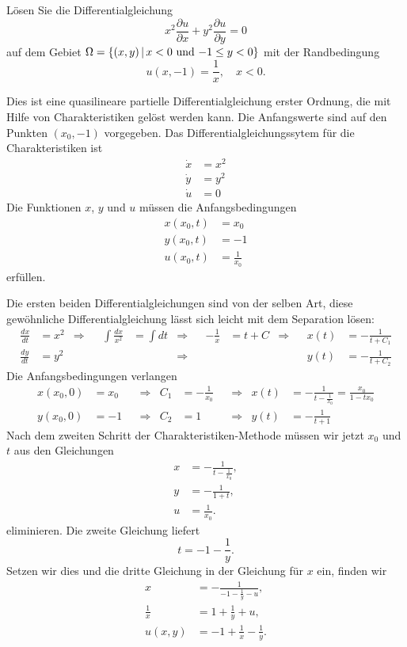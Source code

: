 Lösen Sie die Differentialgleichung
\[
x^2\frac{\partial u}{\partial x}+y^2\frac{\partial u}{\partial y}=0
\]
auf dem Gebiet $\Omega=\{(x,y)\,|\,\text{$ x< 0$ und $-1\le y<0$}\}$ mit der Randbedingung
\[
u(x,-1)=\frac1x,\quad x<0.
\]

\begin{loesung}
Dies ist eine quasilineare partielle Differentialgleichung
erster Ordnung, die mit Hilfe von Charakteristiken gelöst werden
kann.
Die Anfangswerte sind auf den Punkten $(x_0,-1)$ vorgegeben.
Das Differentialgleichungssytem für die Charakteristiken ist
\begin{align*}
\dot x&=x^2\\
\dot y&=y^2\\
\dot u&=0
\end{align*}
Die Funktionen $x$, $y$ und $u$ müssen die Anfangsbedingungen
\begin{align*}
x(x_0,t)&=x_0\\
y(x_0,t)&=-1\\
u(x_0,t)&=\frac1{x_0}
\end{align*}
erfüllen.

Die ersten beiden Differentialgleichungen sind von der selben Art, diese
gewöhnliche Differentialgleichung lässt sich leicht mit dem Separation lösen:
\begin{align*}
\frac{dx}{dt}&=x^2
&\Rightarrow&
&\int\frac{dx}{x^2}&=\int dt
&\Rightarrow&
&-\frac1x&=t+C
&\Rightarrow&
&x(t)&=-\frac1{t+C_1}
\\
\frac{dy}{dt}&=y^2
&&
&&
&\Rightarrow&
&&
&&
&y(t)&=-\frac1{t+C_2}
\end{align*}
Die Anfangsbedingungen verlangen
\begin{align*}
x(x_0,0)&=x_0&&\Rightarrow&C_1&=-\frac1{x_0}&&\Rightarrow&x(t)&=-\frac1{t-\frac1{x_0}}=\frac{x_0}{1-tx_0}\\
y(x_0,0)&=-1&&\Rightarrow&C_2&=1&&\Rightarrow&y(t)&=-\frac1{t+1}
\end{align*}
Nach dem zweiten Schritt der Charakteristiken-Methode müssen wir jetzt
$x_0$ und $t$ aus den Gleichungen
\begin{align*}
x&=-\frac{1}{t-\frac1{x_0}},\\
y&=-\frac{1}{1+t},\\
u&=\frac1{x_0}.
\end{align*}
eliminieren.
Die zweite Gleichung liefert
\[
t=-1-\frac1{y}.
\]
Setzen wir dies und die dritte Gleichung in der Gleichung für $x$ ein,
finden wir
\begin{align*}
x&=-\frac{1}{-1-\frac1y-u},\\
\frac1x&=1+\frac1y+u,\\
u(x,y)&=-1+\frac1x-\frac1y.
\end{align*}


\end{loesung}
